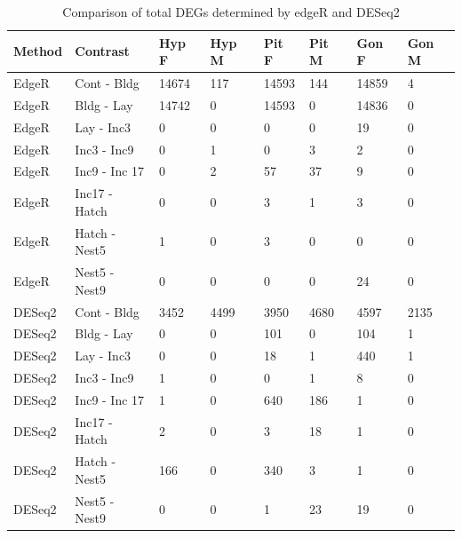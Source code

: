 \documentclass[10pt,letterpaper]{article}
\begin{document}
\begin{table}[hb]
\begin{tabular}{llllllll}
\hline
\textbf{Method} & \textbf{Contrast} & \textbf{Hyp F} & \textbf{Hyp M} & \textbf{Pit F} & \textbf{Pit M} & \textbf{Gon F} & \textbf{Gon M} \\  \hline
EdgeR & Cont - Bldg & 14674 & 117 & 14593 & 144 & 14859 & 4 \\
EdgeR & Bldg - Lay & 14742 & 0 & 14593 & 0 & 14836 & 0 \\
EdgeR & Lay - Inc3 & 0 & 0 & 0 & 0 & 19 & 0 \\
EdgeR & Inc3 - Inc9 & 0 & 1 & 0 & 3 & 2 & 0 \\
EdgeR & Inc9 - Inc 17 & 0 & 2 & 57 & 37 & 9 & 0 \\
EdgeR & Inc17 - Hatch & 0 & 0 & 3 & 1 & 3 & 0 \\
EdgeR & Hatch - Nest5 & 1 & 0 & 3 & 0 & 0 & 0 \\
EdgeR & Nest5 - Nest9 & 0 & 0 & 0 & 0 & 24 & 0 \\  \hline
DESeq2 & Cont - Bldg & 3452 & 4499 & 3950 & 4680 & 4597 & 2135 \\
DESeq2 & Bldg - Lay & 0 & 0 & 101 & 0 & 104 & 1 \\
DESeq2 & Lay - Inc3 & 0 & 0 & 18 & 1 & 440 & 1 \\
DESeq2 & Inc3 - Inc9 & 1 & 0 & 0 & 1 & 8 & 0 \\
DESeq2 & Inc9 - Inc 17 & 1 & 0 & 640 & 186 & 1 & 0 \\
DESeq2 & Inc17 - Hatch & 2 & 0 & 3 & 18 & 1 & 0 \\
DESeq2 & Hatch - Nest5 & 166 & 0 & 340 & 3 & 1 & 0 \\
DESeq2 & Nest5 - Nest9 & 0 & 0 & 1 & 23 & 19 & 0 \\ \hline
\end{tabular}
\caption{Comparison of total DEGs determined by edgeR and DESeq2}
\label{tab:my-table}
\end{table}
\end{document}

